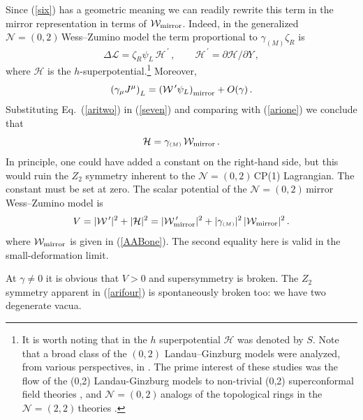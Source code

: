 \documentclass[epsfig,12pt]{article}
\def\beq{\begin{equation}}
\def\eeq{\end{equation}}
\newcommand{\ntt}{${\mathcal N}=(2,2)\,$}
\newcommand{\nzt}{${\mathcal N}=(0,2)\,$}
\newcommand{\cell}{{\mathcal L}}
\newcommand{\cw}{{\mathcal W}}
\def\beq{\begin{equation}}
\def\eeq{\end{equation}}
\newcommand{\ssm}{{\scriptscriptstyle(M)}}
\begin{document}
{Since (\ref{six}) has a geometric meaning we can readily rewrite this term in the mirror representation in terms of 
${\mathcal W}_{\rm mirror}$.
 Indeed, in the generalized \nzt Wess--Zumino model the term proportional to $\gamma_\ssm \zeta_R$ is
 \cite{SYneww}
 \beq
 \Delta\cell = \zeta_R \psi_L\,{\mathcal H}^{\,\prime}\,,\qquad {\mathcal H}^{\,\prime} =\partial {\mathcal H}/\partial Y\,,
 \label{arione}
 \eeq
 where ${\mathcal H}$ is the $h$-superpotential.\footnote{It is worth noting
 that in \cite{SYneww} the $h$ superpotential ${\mathcal H}$ was denoted by $S$.
 Note that a broad class of
the $(0,2)$ Landau--Ginzburg models were analyzed, from various perspectives, in \cite{D1,D2,D3}.
The prime interest of these studies was the flow of the  (0,2) Landau-Ginzburg models  to
non-trivial (0,2) superconformal field theories \cite{D1,D2}, and  \nzt analogs of the topological rings
in the \ntt theories \cite{D3}.} Moreover,
 \beq
 \left(\gamma_\mu J^\mu\right)_L = \left({\mathcal W}^{\,\prime} \psi_{L}\right)_{\rm mirror} +O(\gamma)\,.
  \label{aritwo}
 \eeq
Substituting Eq.~(\ref{aritwo}) in (\ref{seven}) and comparing with (\ref{arione}) we conclude that
\beq
{\mathcal H} = \gamma_\ssm\,{\mathcal W}_{\rm mirror}\,.
  \label{arithree}
 \eeq
 In principle, one could have added a constant on the right-hand side, but this would ruin the $Z_2$ 
 symmetry inherent to the \nzt CP(1) Lagrangian. The constant must be set at zero. 
 The scalar potential of the \nzt mirror Wess--Zumino model 
  is \cite{SYneww}
 \beq
 V= |\cw^{\,\prime} |^2+|\mathcal H|^2 = |\cw^{\,\prime}_{\rm mirror} |^2 +|\gamma_\ssm |^2\,|\cw_{\rm mirror} |^2\,.
   \label{arifour}
 \eeq
 where $\cw_{\rm mirror} $ is given in (\ref{AABone}).
 The second equality here is valid in the small-deformation limit.
 
At $\gamma \neq 0$ it is obvious that $V>0$ and supersymmetry is broken.
The $Z_2$ symmetry apparent in (\ref{arifour}) is spontaneously broken too:
we have two degenerate vacua.



}
\end{document}
